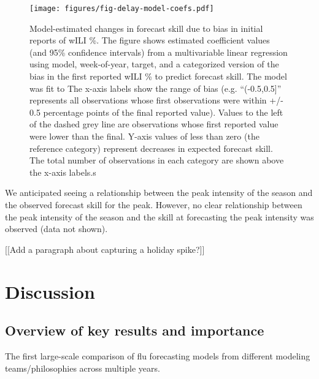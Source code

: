 \documentclass{article}\usepackage[]{graphicx}\usepackage[]{color}
\begin{document}
\begin{figure}[htbp]
\begin{center}
\texttt{[image: figures/fig-delay-model-coefs.pdf]}
\caption{Model-estimated changes in forecast skill due to bias in initial reports of wILI \%. The figure shows estimated coefficient values (and 95\% confidence intervals) from a multivariable linear regression using model, week-of-year, target, and a categorized version of the bias in the first reported wILI \% to predict forecast skill. The model was fit to  The x-axis labels show the range of bias (e.g. ``(-0.5,0.5]'' represents all observations whose first observations were within +/- 0.5 percentage points of the final reported value). Values to the left of the dashed grey line are observations whose first reported value were lower than the final. Y-axis values of less than zero (the reference category) represent decreases in expected forecast skill. The total number of observations in each category are shown above the x-axis labels.s}
\label{fig:delay-model-coefs}
\end{center}
\end{figure}


We anticipated seeing a relationship between the peak intensity of the season and the observed forecast skill for the peak. 
However, no clear relationship between the peak intensity of the season and the skill at forecasting the peak intensity was observed (data not shown).

[[Add a paragraph about capturing a holiday spike?]]



\section{Discussion}

\subsection{Overview of key results and importance}
The first large-scale comparison of flu forecasting models from different modeling teams/philosophies across multiple years.
\end{document}
